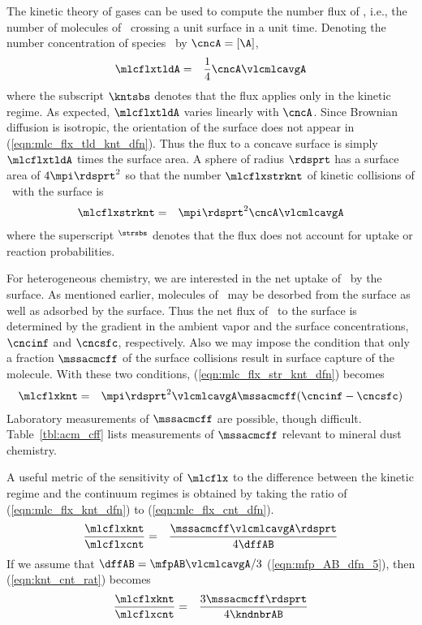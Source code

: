 \documentclass[12pt,twoside]{book}
\newcounter{reaction} %
\begin{document}
The kinetic theory of gases can be used to compute the number flux of
\A, i.e., the number of molecules of \A\ crossing a unit surface in a
unit time.
Denoting the number concentration of species \A\ by $\cncA = [\A]$,
\begin{eqnarray}
\mlcflxtldA & = & \frac{1}{4} \cncA \vlcmlcavgA
\label{eqn:mlc_flx_tld_knt_dfn}
\end{eqnarray}
where the subscript $\kntsbs$ denotes that the flux applies only in
the kinetic regime.
As expected, $\mlcflxtldA$ varies linearly with $\cncA$. 
Since Brownian diffusion is isotropic, the orientation of the surface
does not appear in (\ref{eqn:mlc_flx_tld_knt_dfn}).
Thus the flux to a concave surface is simply $\mlcflxtldA$ times the
surface area.
A sphere of radius $\rdsprt$ has a surface area of $4\mpi \rdsprt^{2}$ so
that the number $\mlcflxstrknt$ of kinetic collisions of \A\ with the 
surface is 
\begin{eqnarray}
\mlcflxstrknt & = & \mpi \rdsprt^{2} \cncA \vlcmlcavgA
\label{eqn:mlc_flx_str_knt_dfn}
\end{eqnarray}
where the superscript $^{\strsbs}$ denotes that the flux does not
account for uptake or reaction probabilities.

For heterogeneous chemistry, we are interested in the net uptake of
\A\ by the surface.
As mentioned earlier, molecules of \A\ may be desorbed from the
surface as well as adsorbed by the surface.
Thus the net flux of \A\ to the surface is determined by the gradient
in the ambient vapor and the surface concentrations, $\cncinf$ and
$\cncsfc$, respectively.  
Also we may impose the condition that only a fraction $\mssacmcff$ of
the surface collisions result in surface capture of the molecule.
With these two conditions, (\ref{eqn:mlc_flx_str_knt_dfn}) becomes
\begin{eqnarray}
\mlcflxknt & = & \mpi \rdsprt^{2} \vlcmlcavgA \mssacmcff ( \cncinf - \cncsfc ) 
\label{eqn:mlc_flx_knt_dfn}
\end{eqnarray}
Laboratory measurements of $\mssacmcff$ are possible, though
difficult. 
Table~\ref{tbl:acm_cff} lists measurements of $\mssacmcff$ relevant to
mineral dust chemistry.

A useful metric of the sensitivity of $\mlcflx$ to the difference
between the kinetic regime and the continuum regimes is obtained by
taking the ratio of (\ref{eqn:mlc_flx_knt_dfn}) to
(\ref{eqn:mlc_flx_cnt_dfn}). 
\begin{eqnarray}
\frac{\mlcflxknt}{\mlcflxcnt } & = & 
\frac{\mssacmcff \vlcmlcavgA \rdsprt}{4 \dffAB }
\label{eqn:knt_cnt_rat}
\end{eqnarray}
If we assume that $\dffAB = \mfpAB \vlcmlcavgA / 3$
(\ref{eqn:mfp_AB_dfn_5}), then (\ref{eqn:knt_cnt_rat}) becomes
\begin{eqnarray}
\frac{\mlcflxknt}{\mlcflxcnt } & = & 
\frac{3 \mssacmcff \rdsprt}{4 \kndnbrAB }
\label{eqn:knt_cnt_rat_2}
\end{eqnarray}
\end{document}
